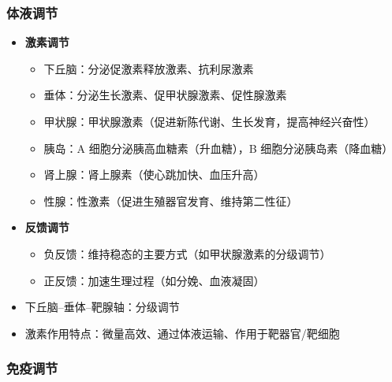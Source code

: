 \subsubsection{体液调节}

\begin{itemize}
  \item \textbf{激素调节}
  \begin{itemize}
    \item 下丘脑：分泌促激素释放激素、抗利尿激素
    \item 垂体：分泌生长激素、促甲状腺激素、促性腺激素
    \item 甲状腺：甲状腺激素（促进新陈代谢、生长发育，提高神经兴奋性）
    \item 胰岛：A 细胞分泌胰高血糖素（升血糖），B 细胞分泌胰岛素（降血糖）
    \item 肾上腺：肾上腺素（使心跳加快、血压升高）
    \item 性腺：性激素（促进生殖器官发育、维持第二性征）
  \end{itemize}
  \item \textbf{反馈调节}
  \begin{itemize}
    \item 负反馈：维持稳态的主要方式（如甲状腺激素的分级调节）
    \item 正反馈：加速生理过程（如分娩、血液凝固）
  \end{itemize}
  \item 下丘脑--垂体--靶腺轴：分级调节
  \item 激素作用特点：微量高效、通过体液运输、作用于靶器官/靶细胞
\end{itemize}

\subsubsection{免疫调节}

